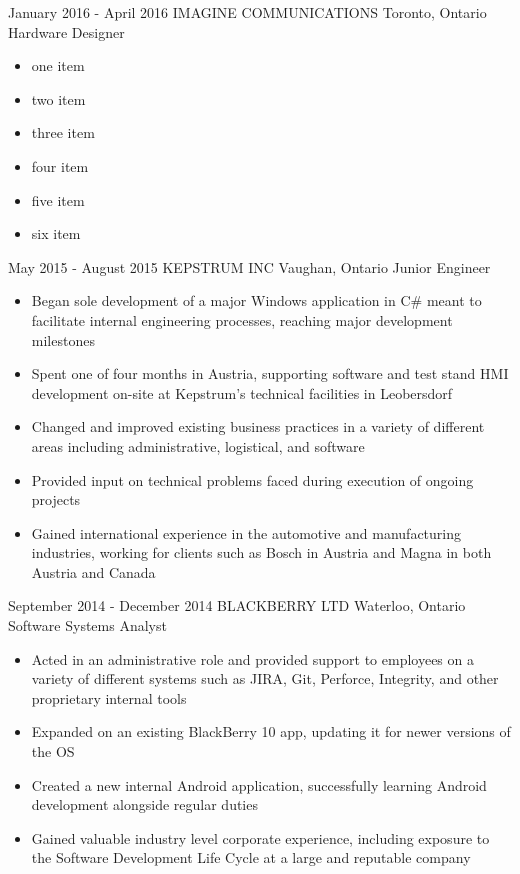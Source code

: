 \documentclass[hidelinks]{kkurucz-cv}
\begin{document}
\begin{entrylist}
\entry
{January 2016 - April 2016}
{IMAGINE COMMUNICATIONS}
{Toronto, Ontario}
{Hardware Designer}
{
\begin{itemize}
	\item one item
	\item two item
	\item three item
	\item four item
	\item five item
	\item six item
\end{itemize}
}

\entry
{May 2015 - August 2015}
{KEPSTRUM INC}
{Vaughan, Ontario}
{Junior Engineer}
{
\begin{itemize}
	\item Began sole development of a major Windows application in C\# meant to facilitate internal engineering processes, reaching major development milestones
	\item Spent one of four months in Austria, supporting software and test stand HMI development on-site at Kepstrum’s technical facilities in Leobersdorf
	\item Changed and improved existing business practices in a variety of different areas including administrative, logistical, and software
	\item Provided input on technical problems faced during execution of ongoing projects
	\item Gained international experience in the automotive and manufacturing industries, working for clients such as Bosch in Austria and Magna in both Austria and Canada
\end{itemize}
}

\entry
{September 2014 - December 2014}
{BLACKBERRY LTD}
{Waterloo, Ontario}
{Software Systems Analyst}
{
\begin{itemize}
	\item Acted in an administrative role and provided support to employees on a variety of different systems such as JIRA, Git, Perforce, Integrity, and other proprietary internal tools
	\item Expanded on an existing BlackBerry 10 app, updating it for newer versions of the OS
	\item Created a new internal Android application, successfully learning Android development alongside regular duties
	\item Gained valuable industry level corporate experience, including exposure to the Software Development Life Cycle at a large and reputable company
\end{itemize}
}


\end{entrylist}
\end{document}
